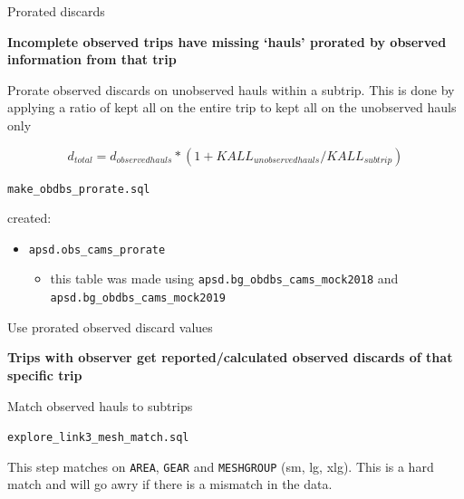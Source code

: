 \documentclass[
  ignorenonframetext,
]{beamer}
\providecommand{\tightlist}{%
  \setlength{\itemsep}{0pt}\setlength{\parskip}{0pt}}
\begin{document}
\begin{frame}[fragile]{Prorated discards}
\protect\hypertarget{prorated-discards}{}

\textbf{Incomplete observed trips have missing `hauls' prorated by
observed information from that trip}

Prorate observed discards on unobserved hauls within a subtrip. This is
done by applying a ratio of kept all on the entire trip to kept all on
the unobserved hauls only

\[d_{total} = d_{observedhauls}*(1+KALL_{unobserved hauls}/KALL_{subtrip})\]

\texttt{make\_obdbs\_prorate.sql}

created:

\begin{itemize}
\tightlist
\item
  \texttt{apsd.obs\_cams\_prorate}

  \begin{itemize}
  \tightlist
  \item
    this table was made using \texttt{apsd.bg\_obdbs\_cams\_mock2018}
    and \texttt{apsd.bg\_obdbs\_cams\_mock2019}
  \end{itemize}
\end{itemize}

\end{frame}

\begin{frame}[fragile]{Use prorated observed discard values}
\protect\hypertarget{use-prorated-observed-discard-values}{}

\textbf{Trips with observer get reported/calculated observed discards of
that specific trip}

Match observed hauls to subtrips

\texttt{explore\_link3\_mesh\_match.sql}

This step matches on \texttt{AREA}, \texttt{GEAR} and \texttt{MESHGROUP}
(sm, lg, xlg). This is a hard match and will go awry if there is a
mismatch in the data.

\end{frame}
\end{document}
